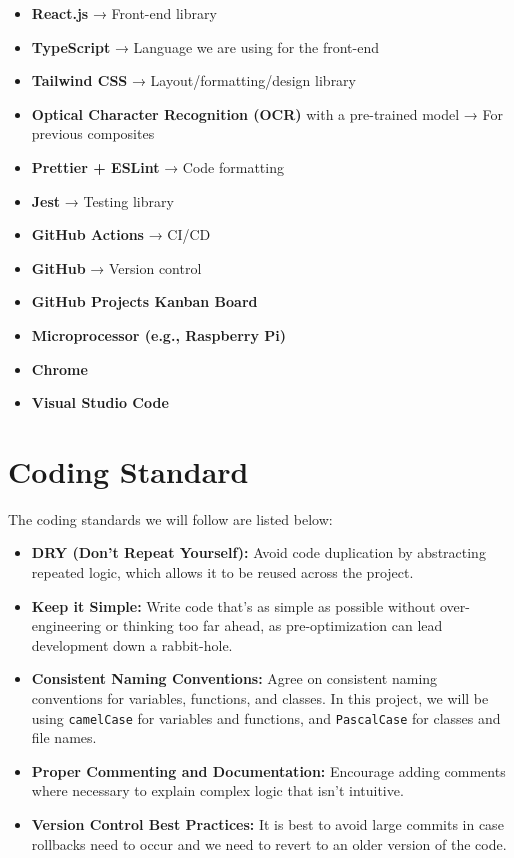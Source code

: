 \documentclass{article}
\begin{document}
\begin{itemize}
    \item \textbf{React.js} → Front-end library
    \item \textbf{TypeScript} → Language we are using for the front-end
    \item \textbf{Tailwind CSS} → Layout/formatting/design library
    \item \textbf{Optical Character Recognition (OCR)} with a pre-trained model → For previous composites
    \item \textbf{Prettier + ESLint} → Code formatting
    \item \textbf{Jest} → Testing library
    \item \textbf{GitHub Actions} → CI/CD
    \item \textbf{GitHub} → Version control
    \item \textbf{GitHub Projects Kanban Board}
    \item \textbf{Microprocessor (e.g., Raspberry Pi)}
    \item \textbf{Chrome}
    \item \textbf{Visual Studio Code}
\end{itemize}

\section{Coding Standard}

\newline
The coding standards we will follow are listed below:

\begin{itemize}
    \item \textbf{DRY (Don't Repeat Yourself):} Avoid code duplication by abstracting repeated logic, which allows it to be reused across the project.
    \item \textbf{Keep it Simple:} Write code that's as simple as possible without over-engineering or thinking too far ahead, as pre-optimization can lead development down a rabbit-hole.
    \item \textbf{Consistent Naming Conventions:} Agree on consistent naming conventions for variables, functions, and classes. In this project, we will be using \texttt{camelCase} for variables and functions, and \texttt{PascalCase} for classes and file names.
    \item \textbf{Proper Commenting and Documentation:} Encourage adding comments where necessary to explain complex logic that isn’t intuitive.
    \item \textbf{Version Control Best Practices:} It is best to avoid large commits in case rollbacks need to occur and we need to revert to an older version of the code.
\end{itemize}
\end{document}
